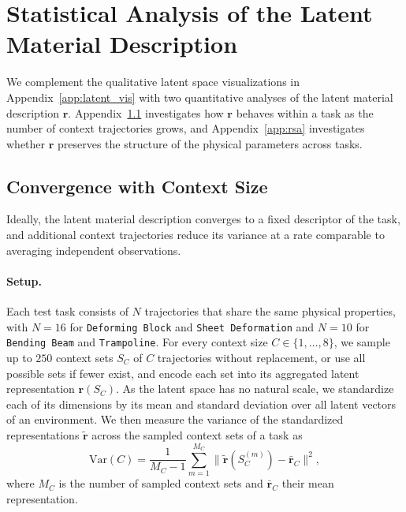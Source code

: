 \section{Statistical Analysis of the Latent Material Description}
\label{app:latent_analysis}

We complement the qualitative latent space visualizations in Appendix~\ref{app:latent_vis} with two quantitative analyses of the latent material description $\mathbf{r}$. Appendix~\ref{app:r_convergence} investigates how $\mathbf{r}$ behaves within a task as the number of context trajectories grows, and Appendix~\ref{app:rsa} investigates whether $\mathbf{r}$ preserves the structure of the physical parameters across tasks.

\subsection{Convergence with Context Size}
\label{app:r_convergence}

Ideally, the latent material description converges to a fixed descriptor of the task, and additional context trajectories reduce its variance at a rate comparable to averaging independent observations.

\paragraph{Setup.}
Each test task consists of $N$ trajectories that share the same physical properties, with $N=16$ for \texttt{Deforming Block} and \texttt{Sheet Deformation} and $N=10$ for \texttt{Bending Beam} and \texttt{Trampoline}. For every context size $C \in \{1, \dots, 8\}$, we sample up to $250$ context sets $S_C$ of $C$ trajectories without replacement, or use all possible sets if fewer exist, and encode each set into its aggregated latent representation $\mathbf{r}(S_C)$. As the latent space has no natural scale, we standardize each of its dimensions by its mean and standard deviation over all latent vectors of an environment. We then measure the variance of the standardized representations $\tilde{\mathbf{r}}$ across the sampled context sets of a task as
\begin{equation*}
    \mathrm{Var}(C) = \frac{1}{M_C - 1} \sum_{m=1}^{M_C} \bigl\| \tilde{\mathbf{r}}(S_C^{(m)}) - \bar{\mathbf{r}}_C \bigr\|^2 ,
\end{equation*}
where $M_C$ is the number of sampled context sets and $\bar{\mathbf{r}}_C$ their mean representation.

